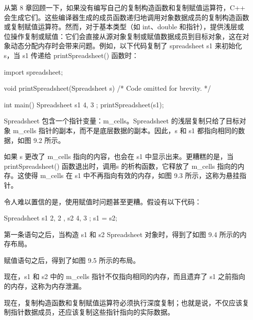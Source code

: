 
从第 8 章回顾一下，如果没有编写自己的复制构造函数和复制赋值运算符，C++ 会生成它们。这些编译器生成的成员函数递归地调用对象数据成员的复制构造函数或复制赋值运算符。然而，对于基本类型（如 int、double 和指针），提供浅层或位操作复制或赋值：它们会直接从源对象复制或赋值数据成员到目标对象，这在对象动态分配内存时会带来问题。例如，以下代码复制了 spreadsheet s1 来初始化 s，当 s1 传递给 printSpreadsheet() 函数时：

\begin{cpp}
import spreadsheet;

void printSpreadsheet(Spreadsheet s) { /* Code omitted for brevity. */ }

int main()
{
    Spreadsheet s1 { 4, 3 };
    printSpreadsheet(s1);
}
\end{cpp}

Spreadsheet 包含一个指针变量：m\_cells。Spreadsheet 的浅层复制只给了目标对象 m\_cells 指针的副本，而不是底层数据的副本。因此，s 和 s1 都指向相同的数据，如图 9.2 所示。


如果 s 更改了 m\_cells 指向的内容，也会在 s1 中显示出来。更糟糕的是，当 printSpreadsheet() 函数退出时，调用s 的析构函数，它释放了 m\_cells 指向的内存。这使得 m\_cells 在 s1 中不再指向有效的内存，如图 9.3 所示，这称为悬挂指针。


令人难以置信的是，使用赋值时问题甚至更糟。假设有以下代码：

\begin{cpp}
Spreadsheet s1 { 2, 2 }, s2 { 4, 3 };
s1 = s2;
\end{cpp}

第一条语句之后，当构造 s1 和 s2 Spreadsheet 对象时，得到了如图 9.4 所示的内存布局。


赋值语句之后，得到了如图 9.5 所示的布局。


现在，s1 和 s2 中的 m\_cells 指针不仅指向相同的内存，而且遗弃了 s1 之前指向的内存，这称为内存泄漏。

现在，复制构造函数和复制赋值运算符必须执行深度复制；也就是说，不仅应该复制指针数据成员，还应该复制这些指针指向的实际数据。

